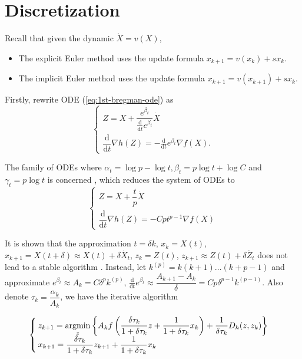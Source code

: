 \section{Discretization}
Recall that given the dynamic $\dot{X} = v(X)$,
\begin{itemize}
    \item The explicit Euler method uses the update formula $x_{k+1} = v(x_k) + sx_k$.
    \item The implicit Euler method uses the update formula $x_{k+1} = v(x_{k+1}) + sx_k$.
\end{itemize}

Firstly, rewrite ODE (\ref{eq:1st-bregman-ode}) as
\begin{equation}
    \begin{cases}
        Z = X + \dfrac{e^{\beta_t}}{\frac{\mathrm{d}}{\mathrm{d}t}e^{\beta_t}}\dot{X} \\
        \dfrac{\mathrm{d}}{\mathrm{d}t}\nabla h(Z) = -\frac{\mathrm{d}}{\mathrm{d}t}e^{\beta_t}\nabla f(X).
    \end{cases}
\end{equation}

The family of ODEs where $\alpha_t = \log p - \log t, \beta_t = p\log t + \log C$ and $\gamma_t = p\log t$ is concerned \cite{wibisono2016variational}, which reduces the system of ODEs to
\begin{equation}
    \begin{cases}
        Z = X + \dfrac{t}{p}\dot{X} \\
        \dfrac{\mathrm{d}}{\mathrm{d}t}\nabla h(Z) = -Cpt^{p-1}\nabla f(X)
    \end{cases}
\end{equation}

It is shown that the approximation $t=\delta k$, $x_k = X(t)$, $x_{k+1} = X(t+\delta)\approx X(t) + \delta \dot{X_t}$, $z_k = Z(t)$, $z_{k+1} \approx Z(t) + \delta \dot{Z_t}$ does not lead to a stable algorithm \cite{wibisono2016variational}. Instead, let $k^{(p)} = k(k+1)\ldots(k+p-1)$ and approximate $e^{\beta_t} \approx A_k = C\delta^pk^{(p)}$, $\frac{\mathrm{d}}{\mathrm{d}t}e^{\beta_t} \approx \dfrac{A_{k+1} - A_k}{\delta} = Cp\delta^{p-1}k^{(p-1)}$. Also denote $\tau_k = \dfrac{\alpha_k}{A_k}$, we have the iterative algorithm

\begin{equation}
    \begin{cases}
        z_{k+1} = \operatorname*{argmin}\limits_{z}\left\{A_k f\left(\dfrac{\delta\tau_k}{1+\delta\tau_k}z + \dfrac{1}{1+\delta\tau_k}x_k \right) + \dfrac{1}{\delta\tau_k}D_h(z, z_{k})\right\} \\
        x_{k+1} = \dfrac{\delta\tau_k}{1+\delta\tau_k}z_{k+1} + \dfrac{1}{1+\delta\tau_k}x_k                                                                                      \\
    \end{cases}
    \label{algorithm:1st-implicit}
\end{equation}

